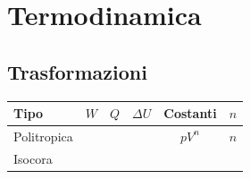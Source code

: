 \section{Termodinamica}
\subsection{Trasformazioni}

\begin{longtable}[]{@{}lccccc@{}}
\toprule
\begin{minipage}[b]{0.07\columnwidth}\raggedright
Tipo\strut
\end{minipage} & \begin{minipage}[b]{0.13\columnwidth}\centering
\(W\)\strut
\end{minipage} & \begin{minipage}[b]{0.09\columnwidth}\centering
\(Q\)\strut
\end{minipage} & \begin{minipage}[b]{0.09\columnwidth}\centering
\(\Delta U\)\strut
\end{minipage} & \begin{minipage}[b]{0.39\columnwidth}\centering
Costanti\strut
\end{minipage} & \begin{minipage}[b]{0.05\columnwidth}\centering
\(n\)\strut
\end{minipage}\tabularnewline
\midrule
\endhead
\begin{minipage}[t]{0.07\columnwidth}\raggedright
Politropica\strut
\end{minipage} & \begin{minipage}[t]{0.13\columnwidth}\centering
\strut
\end{minipage} & \begin{minipage}[t]{0.09\columnwidth}\centering
\strut
\end{minipage} & \begin{minipage}[t]{0.09\columnwidth}\centering
\strut
\end{minipage} & \begin{minipage}[t]{0.39\columnwidth}\centering
\(pV^n\)\strut
\end{minipage} & \begin{minipage}[t]{0.05\columnwidth}\centering
\(n\)\strut
\end{minipage}\tabularnewline
\begin{minipage}[t]{0.07\columnwidth}\raggedright
Isocora\strut
\end{minipage} & \begin{minipage}[t]{0.13\columnwidth}\centering

\end{minipage}
\end{longtable}
